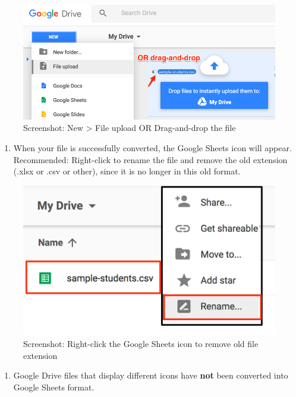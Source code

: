 \documentclass[
  english,
]{book}
\providecommand{\tightlist}{%
  \setlength{\itemsep}{0pt}\setlength{\parskip}{0pt}}
\begin{document}
\begin{figure}
\centering
\includegraphics{images/02-spreadsheet/google-drive-upload-methods.png}
\caption{Screenshot: New \textgreater{} File upload OR Drag-and-drop the file}
\end{figure}

\begin{enumerate}
\def\labelenumi{\arabic{enumi})}
\setcounter{enumi}{3}
\tightlist
\item
  When your file is successfully converted, the Google Sheets icon will appear. Recommended: Right-click to rename the file and remove the old extension (.xlsx or .csv or other), since it is no longer in this old format.
\end{enumerate}

\begin{figure}
\centering
\includegraphics{images/02-spreadsheet/google-drive-sheets-icon-rename.png}
\caption{Screenshot: Right-click the Google Sheets icon to remove old file extension}
\end{figure}

\begin{enumerate}
\def\labelenumi{\arabic{enumi})}
\setcounter{enumi}{4}
\tightlist
\item
  Google Drive files that display different icons have \textbf{not} been converted into Google Sheets format.
\end{enumerate}
\end{document}
